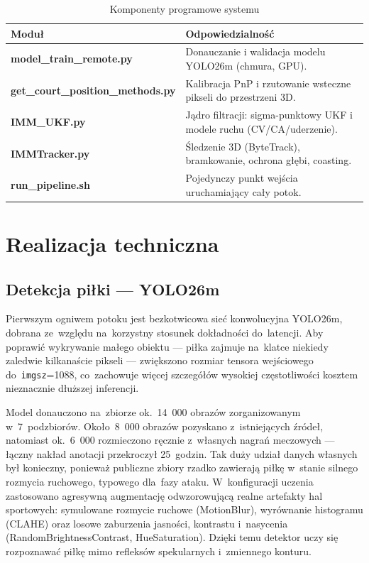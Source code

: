 \documentclass[14pt,a4paper]{extarticle}
\begin{document}
\begin{table}[H]
\centering
\caption{Komponenty programowe systemu}
\label{tab:moduly}
\renewcommand{\arraystretch}{1.2}
\footnotesize
\begin{tabularx}{\textwidth}{>{\bfseries\ttfamily\scriptsize}p{4.8cm} X}
\toprule
\rowcolor{vbHead}\textbf{Moduł} & \textbf{Odpowiedzialność} \\
\midrule
model\_train\_remote.py        & Donauczanie i walidacja modelu YOLO26m (chmura, GPU). \\
get\_court\_position\_methods.py & Kalibracja PnP i rzutowanie wsteczne pikseli do przestrzeni 3D. \\
IMM\_UKF.py                     & Jądro filtracji: sigma-punktowy UKF i modele ruchu (CV/CA/uderzenie). \\
IMMTracker.py                  & Śledzenie 3D (ByteTrack), bramkowanie, ochrona głębi, coasting. \\
run\_pipeline.sh               & Pojedynczy punkt wejścia uruchamiający cały potok. \\
\bottomrule
\end{tabularx}
\end{table}

\section{Realizacja techniczna}

\subsection{Detekcja piłki — YOLO26m}
Pierwszym ogniwem potoku jest bezkotwicowa sieć konwolucyjna YOLO26m, dobrana ze~względu
na~korzystny stosunek dokładności do~latencji. Aby poprawić wykrywanie małego obiektu —
piłka zajmuje na~klatce niekiedy zaledwie kilkanaście pikseli — zwiększono rozmiar tensora
wejściowego do~\texttt{imgsz}=1088, co~zachowuje więcej szczegółów wysokiej częstotliwości
kosztem nieznacznie dłuższej inferencji.

Model donauczono na~zbiorze ok.~14~000 obrazów zorganizowanym w~7~podzbiorów. Około~8~000
obrazów pozyskano z~istniejących źródeł, natomiast ok.~6~000 rozmieczono ręcznie z~własnych
nagrań meczowych — łączny nakład anotacji przekroczył 25~godzin. Tak duży udział danych
własnych był konieczny, ponieważ publiczne zbiory rzadko zawierają piłkę w~stanie silnego
rozmycia ruchowego, typowego dla~fazy ataku. W~konfiguracji uczenia zastosowano agresywną
augmentację odwzorowującą realne artefakty hal sportowych: symulowane rozmycie ruchowe
(MotionBlur), wyrównanie histogramu (CLAHE) oraz losowe zaburzenia jasności, kontrastu
i~nasycenia (RandomBrightnessContrast, HueSaturation). Dzięki temu detektor uczy się
rozpoznawać piłkę mimo refleksów spekularnych i~zmiennego konturu.
\end{document}
